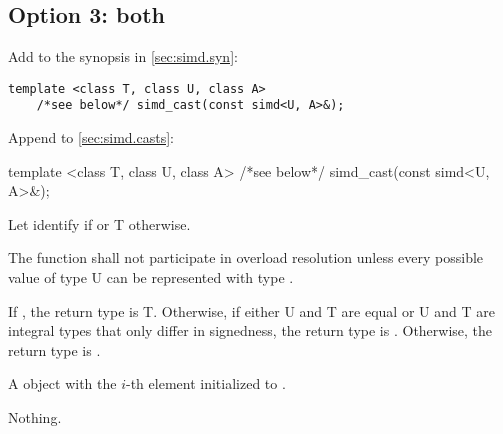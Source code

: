 \subsection{Option 3: both}
Add to the synopsis in \ref{sec:simd.syn}:
\begin{wgText}
  \begin{lstlisting}[style=Vc]
    template <class T, class U, class A>
    /*see below*/ simd_cast(const simd<U, A>&);
  \end{lstlisting}
\end{wgText}

Append to \ref{sec:simd.casts}:
\begin{wgText}
  \begin{itemdecl}
    template <class T, class U, class A>
    /*see below*/ simd_cast(const simd<U, A>&);
  \end{itemdecl}
  \begin{itemdescr}
    \pnum\remarks Let  identify  if  or \type T otherwise.

    \pnum\remarks The function shall not participate in overload resolution unless every possible value of type \type U can be represented with type .

    \pnum\remarks If , the return type is \type T.
    Otherwise, if either \type U and \type T are equal or \type U and \type T are integral types that only differ in signedness, the return type is \simd[<T, A>].
    Otherwise, the return type is .

    \pnum\returns A \simd object with the $i$-th element initialized to .

    \pnum\throws Nothing.
  \end{itemdescr}
\end{wgText}

